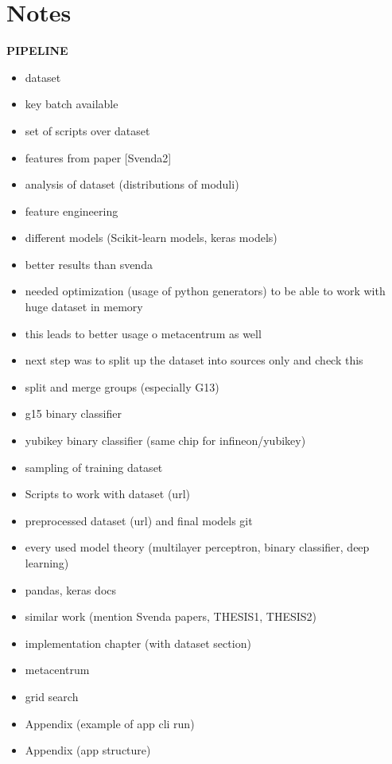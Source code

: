 \chapter{Notes}

\textbf{PIPELINE}
\begin{itemize}

\item dataset
\item key batch available
\item set of scripts over dataset
\item features from paper [Svenda2]
\item analysis of dataset (distributions of moduli)
\item feature engineering
\item different models (Scikit-learn models, keras models)
\item better results than svenda
\item needed optimization (usage of python generators) to be able to work with huge dataset in memory
\item this leads to better usage o metacentrum as well
\item next step was to split up the dataset into sources only and check this
\item split and merge groups (especially G13)
\item g15 binary classifier
\item yubikey binary classifier (same chip for infineon/yubikey)
\item sampling of training dataset 
\item Scripts to work with dataset (url)
\item preprocessed dataset (url) and final models git
\item every used model theory (multilayer perceptron, binary classifier, deep learning)
\item pandas, keras docs
\item similar work (mention Svenda papers, THESIS1, THESIS2)

\item implementation chapter (with dataset section)
\item metacentrum
\item grid search

\item Appendix (example of app cli run)
\item Appendix (app structure)

\end{itemize}